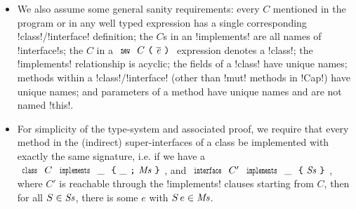 \begin{itemize}
	\item We also assume some general sanity requirements:
	every $C$ mentioned in the program or in any well typed expression has a single corresponding \Q!class!/\Q!interface! definition; the $C$s in an \Q!implements! are all names of \Q!interface!s; the $C$ in a $\new{C}{\es}$ expression denotes a \Q!class!; the \Q!implements! relationship is acyclic; the fields of a \Q!class! have unique names; 
	methods within a \Q!class!/\Q!interface! (other than \Q!mut! methods in \Q!Cap!) have unique names; and parameters of a method have unique names and are not named \Q!this!.

	\item For simplicity of the type-system and associated proof, we require that every method in the (indirect) super-interfaces of a class be implemented with exactly the same signature, i.e. if we have a $\clazz{C}{\_}{\_}{\Ms}$, and $\iclazz{C'}{\_}{\Ss}$, where $C'$ is reachable through the \Q!implements! clauses starting from $C$,
		then for all $S \in \mathit{Ss}$, there is some $e$ with $S\,e \in \mathit{Ms}$.
\end{itemize}

